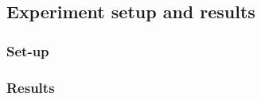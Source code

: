\documentclass[main.tex]{subfiles}
\begin{document}
\subsection{Experiment setup and results}

\subsubsection{Set-up}



\subsubsection{Results}








\end{document}
